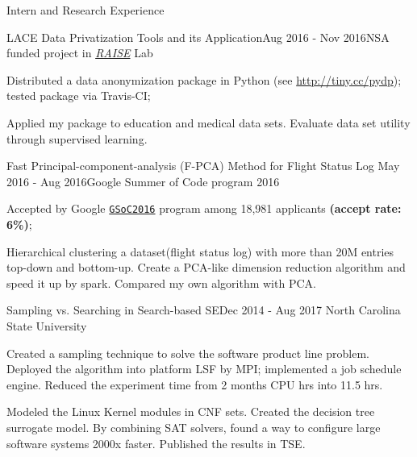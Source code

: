 \documentclass{resume} %
\begin{document}
\begin{rSection}{Intern and Research Experience}
\begin{rSubsection}{LACE Data Privatization Tools and its Application}{Aug 2016 - Nov 2016}{NSA funded project in \href{http://ai4se.net/index}{\textit{RAISE}} Lab}{}
\item Distributed a data anonymization  package in Python (see \url{http://tiny.cc/pydp}); tested package via Travis-CI;
\item Applied my package to education and medical data sets. Evaluate data set utility through supervised learning.
\end{rSubsection}


\begin{rSubsection}{Fast Principal-component-analysis (F-PCA) Method for Flight Status Log} {May 2016 - Aug 2016}{Google Summer of Code program 2016}{}
\item Accepted by Google \href{https://developers.google.com/open-source/gsoc/}{\texttt{GSoC2016}}  program among 18,981 applicants \textbf{(accept rate: 6\%)};
\item Hierarchical clustering a dataset(flight status log) with more than 20M entries top-down and bottom-up. Create a PCA-like dimension reduction algorithm and speed it up by spark. Compared my own algorithm with PCA.
\end{rSubsection}  

\newpage
\begin{rSubsection}{Sampling vs. Searching in Search-based SE}{Dec 2014 - Aug 2017}
{North Carolina State University}{}
\item Created a sampling technique to solve the software product line problem. Deployed the algorithm into platform LSF by MPI; implemented a job schedule engine. Reduced the experiment time from 2 months CPU hrs into 11.5 hrs.
\item Modeled the Linux Kernel modules in CNF sets. Created the decision tree surrogate model. By combining SAT solvers, found a way to configure large software systems 2000x faster. Published the results in TSE.
\end{rSubsection}



\end{rSection}
\end{document}

